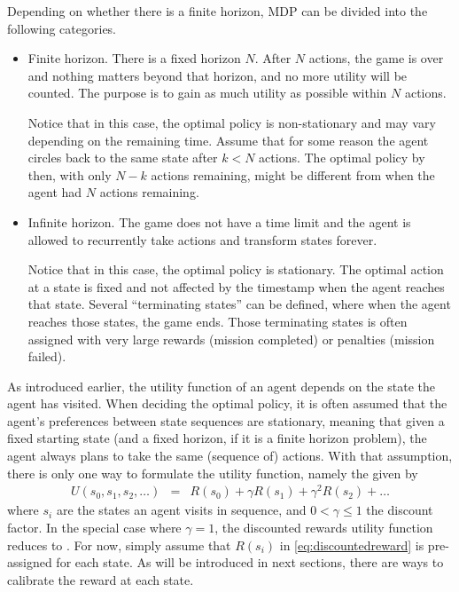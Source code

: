 Depending on whether there is a finite horizon, MDP can be divided into the following categories.
\begin{itemize}
	\item Finite horizon. There is a fixed horizon $N$. After $N$ actions, the game is over and nothing matters beyond that horizon, and no more utility will be counted. The purpose is to gain as much utility as possible within $N$ actions.
	
	Notice that in this case, the optimal policy is non-stationary and may vary depending on the remaining time. Assume that for some reason the agent circles back to the same state after $k<N$ actions. The optimal policy by then, with only $N-k$ actions remaining, might be different from when the agent had $N$ actions remaining.
	
	\item Infinite horizon. The game does not have a time limit and the agent is allowed to recurrently take actions and transform states forever.
	
	Notice that in this case, the optimal policy is stationary. The optimal action at a state is fixed and not affected by the timestamp when the agent reaches that state. Several ``terminating states'' can be defined, where when the agent reaches those states, the game ends. Those terminating states is often assigned with very large rewards (mission completed) or penalties (mission failed).
\end{itemize}

As introduced earlier, the utility function of an agent depends on the state the agent has visited. When deciding the optimal policy, it is often assumed that the agent's preferences between state sequences are stationary, meaning that given a fixed starting state (and a fixed horizon, if it is a finite horizon problem), the agent always plans to take the same (sequence of) actions. With that assumption, there is only one way to formulate the utility function, namely the  given by
\begin{eqnarray}
	U(s_0, s_1, s_2, \ldots) &=& R(s_0) + \gamma R(s_1) + \gamma^2R(s_2) + \ldots \label{eq:discountedreward}
\end{eqnarray}
where $s_i$ are the states an agent visits in sequence, and $0 < \gamma \leq 1$ the discount factor. In the special case where $\gamma = 1$, the discounted rewards utility function reduces to .
For now, simply assume that $R(s_i)$ in \eqref{eq:discountedreward} is pre-assigned for each state. As will be introduced in next sections, there are ways to calibrate the reward at each state.

